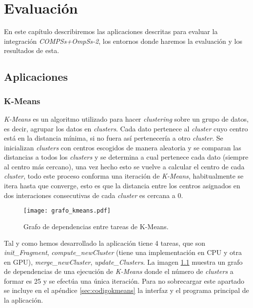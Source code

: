 \chapter{Evaluación}
\label{sec:estudiorend}

En este capítulo describiremos las aplicaciones descritas para evaluar la integración \textit{COMPSs+OmpSs-2}, los entornos donde haremos la evaluación y los resultados de esta.  

\section{Aplicaciones}
\subsection{K-Means}

\textit{K-Means} es un algoritmo utilizado para hacer \textit{clustering} sobre un grupo de datos, es decir, agrupar los datos en \textit{clusters}. Cada dato pertenece al \textit{cluster} cuyo centro está en la distancia mínima, si no fuera así pertenecería a otro \textit{cluster}. Se inicializan \textit{clusters} con centros escogidos de manera aleatoria y se comparan las distancias a todos los \textit{clusters} y se determina a cual pertenece cada dato (siempre al centro más cercano), una vez hecho esto se vuelve a calcular el centro de cada \textit{cluster}, todo este proceso conforma una iteración de \textit{K-Means}, habitualmente se itera hasta que converge, esto es que la distancia entre los centros asignados en dos interaciones consecutivas de cada \textit{cluster} es cercana a 0.

\begin{figure}[h]
	\centering 
	\caption{Grafo de dependencias entre tareas de K-Means.}
	\texttt{[image: grafo\_kmeans.pdf]}
	\label{fig:grafokmeans}
\end{figure}

Tal y como hemos desarrollado la aplicación tiene 4 tareas, que son \textit{init\_Fragment}, \textit{compute\_newCluster} (tiene una implementación en CPU y otra en GPU), \textit{merge\_newCluster}, \textit{update\_Clusters}. La imagen \ref{fig:grafokmeans} muestra un grafo de dependencias de una ejecución de \textit{K-Means} donde el número de \textit{clusters} a formar es 25 y se efectúa una única iteración. Para no sobrecargar este apartado se incluye en el apéndice \ref{sec:codigokmeans} la interfaz y el programa principal de la aplicación.

